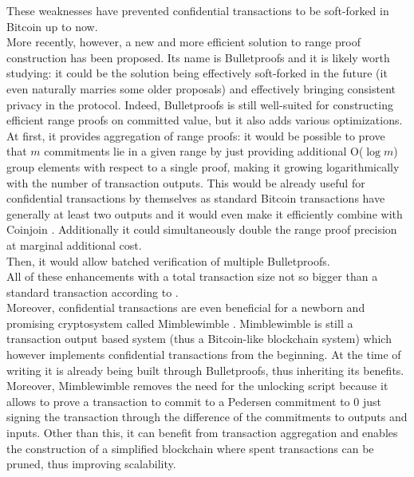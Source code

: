 These weaknesses have prevented confidential transactions to be soft-forked in Bitcoin up to now.\\
More recently, however, a new and more efficient solution to range proof construction \cite{Bulletproofs} has been proposed. Its name is Bulletproofs and it is likely worth studying: it could be the solution being effectively soft-forked in the future (it even naturally marries some older proposals) and effectively bringing consistent privacy in the protocol. Indeed, Bulletproofs is still well-suited for constructing efficient range proofs on committed value, but it also adds various optimizations.\\
At first, it provides aggregation of range proofs: it would be possible to prove that $m$ commitments lie in a given range by just providing additional O($\log m$) group elements with respect to a single proof, making it growing logarithmically with the number of transaction outputs. This would be already useful for confidential transactions by themselves as standard Bitcoin transactions have generally at least two outputs and it would even make it efficiently combine with Coinjoin \cite{Max13}. Additionally it could simultaneously double the range proof precision at marginal additional cost.\\
Then, it would allow batched verification of multiple Bulletproofs.\\ All of these enhancements with a total transaction size not so bigger than a standard transaction according to \cite{Bulletproofs,CT_eff}.\\
Moreover, confidential transactions are even beneficial for a newborn and promising cryptosystem called Mimblewimble \cite{MW, PoeMW}. Mimblewimble is still a transaction output based system (thus a Bitcoin-like blockchain system) which however implements confidential transactions from the beginning. At the time of writing it is already being built through Bulletproofs, thus inheriting its benefits. Moreover, Mimblewimble removes the need for the unlocking script because it allows to prove a transaction to commit to a Pedersen commitment to 0 just signing the transaction through the difference of the commitments to outputs and inputs. Other than this, it can benefit from transaction aggregation and enables the construction of a simplified blockchain where spent transactions can be pruned, thus improving scalability.